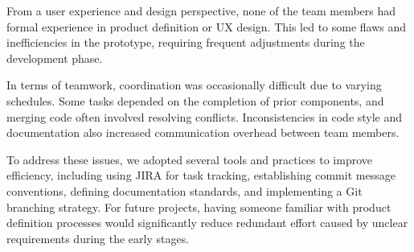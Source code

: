 From a user experience and design perspective, none of the team members had formal experience in product definition or UX design. This led to some flaws and inefficiencies in the prototype, requiring frequent adjustments during the development phase.

In terms of teamwork, coordination was occasionally difficult due to varying schedules. Some tasks depended on the completion of prior components, and merging code often involved resolving conflicts. Inconsistencies in code style and documentation also increased communication overhead between team members.

To address these issues, we adopted several tools and practices to improve efficiency, including using JIRA for task tracking, establishing commit message conventions, defining documentation standards, and implementing a Git branching strategy. For future projects, having someone familiar with product definition processes would significantly reduce redundant effort caused by unclear requirements during the early stages.
